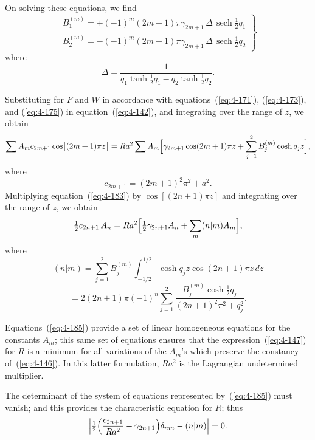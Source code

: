 On solving these equations, we find
\begin{equation}
\label{eq:4-181}
\left.\begin{array}{l}
B_1^{(m)} = +(-1)^m(2m+1)\pi\gamma_{2m+1}\,\Delta\,\operatorname{sech}\tfrac{1}{2}q_1 \\[4pt]
B_2^{(m)} = -(-1)^m(2m+1)\pi\gamma_{2m+1}\,\Delta\,\operatorname{sech}\tfrac{1}{2}q_2
\end{array}\right\}
\end{equation}
where
\begin{equation}
\label{eq:4-182}
\Delta = \frac{1}{q_1\tanh\tfrac{1}{2}q_1-q_2\tanh\tfrac{1}{2}q_2}.
\end{equation}

Substituting for $F$ and $W$ in accordance with equations~(\ref{eq:4-171}), (\ref{eq:4-173}), and (\ref{eq:4-175}) in equation~(\ref{eq:4-142}), and integrating over the range of $z$, we obtain
\begin{equation}
\label{eq:4-183}
\sum A_m c_{2m+1}\cos\bigl[(2m+1)\pi z\bigr] = Ra^2\sum A_m\Bigl[\gamma_{2m+1}\cos(2m+1)\pi z+\sum_{j=1}^{2}B_j^{(m)}\cosh q_j z\Bigr],
\end{equation}
where
\begin{equation}
\label{eq:4-184}
c_{2m+1} = (2m+1)^2\pi^2+a^2.
\end{equation}
Multiplying equation~(\ref{eq:4-183}) by $\cos[(2n+1)\pi z]$ and integrating over the range of $z$, we obtain
\begin{equation}
\label{eq:4-185}
\tfrac{1}{2}c_{2n+1}\,A_n = Ra^2\Bigl[\tfrac{1}{2}\gamma_{2n+1}A_n+\sum_m (n|m)A_m\Bigr],
\end{equation}
where
\begin{equation}
\label{eq:4-186}
(n|m) = \sum_{j=1}^{2}B_j^{(m)}\int_{-1/2}^{1/2}\cosh q_j z\cos(2n+1)\pi z\,dz
\end{equation}
\begin{equation*}
= 2(2n+1)\pi(-1)^n\sum_{j=1}^{2}\frac{B_j^{(m)}\cosh\tfrac{1}{2}q_j}{(2n+1)^2\pi^2+q_j^2}.
\end{equation*}

Equations~(\ref{eq:4-185}) provide a set of linear homogeneous equations for the constants $A_m$; this same set of equations ensures that the expression~(\ref{eq:4-147}) for $R$ is a minimum for all variations of the $A_m$'s which preserve the constancy of~(\ref{eq:4-146}). In this latter formulation, $Ra^2$ is the Lagrangian undetermined multiplier.

The determinant of the system of equations represented by~(\ref{eq:4-185}) must vanish; and this provides the characteristic equation for $R$; thus
\begin{equation}
\label{eq:4-187}
\left|\tfrac{1}{2}\Bigl(\frac{c_{2n+1}}{Ra^2}-\gamma_{2n+1}\Bigr)\delta_{nm}-(n|m)\right| = 0.
\end{equation}

